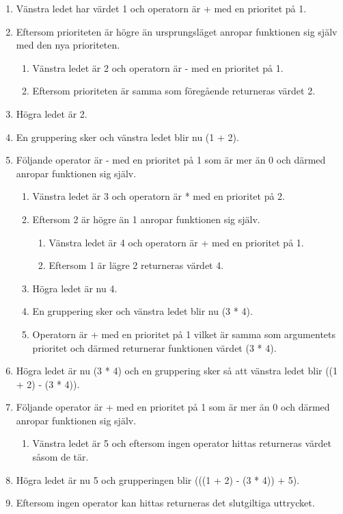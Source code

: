 \begin{enumerate}\itemsep1pt \parskip0pt 
  \item Vänstra ledet har värdet 1 och operatorn är + med en prioritet på 1.
  \item Eftersom prioriteten är högre än ursprungsläget anropar funktionen sig
    själv med den nya prioriteten.
    \begin{enumerate}
      \item Vänstra ledet är 2 och operatorn är - med en prioritet på 1.
      \item Eftersom prioriteten är samma som föregående returneras värdet 2.
    \end{enumerate}
  \item Högra ledet är 2.
  \item En gruppering sker och vänstra ledet blir nu (1 + 2).
  \item Följande operator är - med en prioritet på 1 som är mer än 0 och
    därmed anropar funktionen sig själv.
    \begin{enumerate}
      \item Vänstra ledet är 3 och operatorn är * med en prioritet på 2.
      \item Eftersom 2 är högre än 1 anropar funktionen sig själv.
      \begin{enumerate}
        \item Vänstra ledet är 4 och operatorn är + med en prioritet på 1.
        \item Eftersom 1 är lägre 2 returneras värdet 4.
      \end{enumerate}
      \item Högra ledet är nu 4.
      \item En gruppering sker och vänstra ledet blir nu (3 * 4).
      \item Operatorn är + med en prioritet på 1 vilket är samma som
        argumentets prioritet och därmed returnerar funktionen värdet (3 * 4).
    \end{enumerate}
  \item Högra ledet är nu (3 * 4) och en gruppering sker så att vänstra ledet
    blir ((1 + 2) - (3 * 4)).
  \item Följande operator är + med en prioritet på 1 som är mer än 0 och
    därmed anropar funktionen sig själv.
    \begin{enumerate}
      \item Vänstra ledet är 5 och eftersom ingen operator hittas returneras
        värdet såsom de tär.
    \end{enumerate}
  \item Högra ledet är nu 5 och grupperingen blir (((1 + 2) - (3 * 4)) + 5).
  \item Eftersom ingen operator kan hittas returneras det slutgiltiga
    uttrycket.
\end{enumerate}

